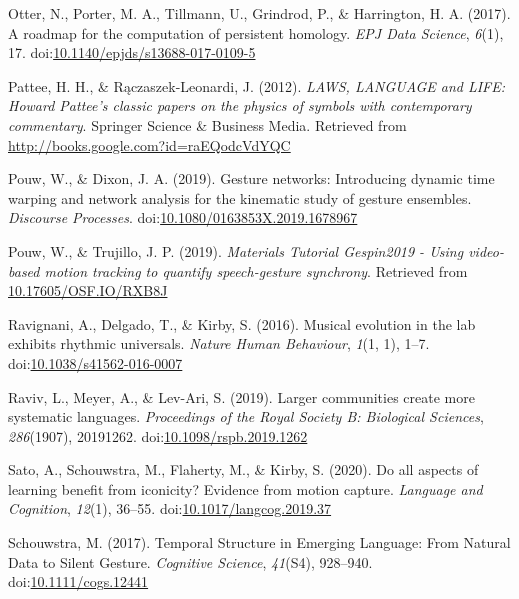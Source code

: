 \documentclass[
  man, noextraspace,floatsintext]{apa6}
\newlength{\cslhangindent}
\newenvironment{cslreferences}%
  {\setlength{\parindent}{0pt}%
  \everypar{\setlength{\hangindent}{\cslhangindent}}\ignorespaces}%
  {\par}
\begin{document}
\begin{cslreferences}
\leavevmode\hypertarget{ref-otterRoadmapComputationPersistent2017}{}%
Otter, N., Porter, M. A., Tillmann, U., Grindrod, P., \& Harrington, H. A. (2017). A roadmap for the computation of persistent homology. \emph{EPJ Data Science}, \emph{6}(1), 17. doi:\href{https://doi.org/10.1140/epjds/s13688-017-0109-5}{10.1140/epjds/s13688-017-0109-5}

\leavevmode\hypertarget{ref-patteeLAWSLANGUAGELIFE2012}{}%
Pattee, H. H., \& Rączaszek-Leonardi, J. (2012). \emph{LAWS, LANGUAGE and LIFE: Howard Pattee's classic papers on the physics of symbols with contemporary commentary}. Springer Science \& Business Media. Retrieved from \url{http://books.google.com?id=raEQodcVdYQC}

\leavevmode\hypertarget{ref-pouwGestureNetworksIntroducing2019}{}%
Pouw, W., \& Dixon, J. A. (2019). Gesture networks: Introducing dynamic time warping and network analysis for the kinematic study of gesture ensembles. \emph{Discourse Processes}. doi:\href{https://doi.org/10.1080/0163853X.2019.1678967}{10.1080/0163853X.2019.1678967}

\leavevmode\hypertarget{ref-pouwMaterialsTutorialGespin20192019}{}%
Pouw, W., \& Trujillo, J. P. (2019). \emph{Materials Tutorial Gespin2019 - Using video-based motion tracking to quantify speech-gesture synchrony}. Retrieved from \url{10.17605/OSF.IO/RXB8J}

\leavevmode\hypertarget{ref-ravignaniMusicalEvolutionLab2016}{}%
Ravignani, A., Delgado, T., \& Kirby, S. (2016). Musical evolution in the lab exhibits rhythmic universals. \emph{Nature Human Behaviour}, \emph{1}(1, 1), 1--7. doi:\href{https://doi.org/10.1038/s41562-016-0007}{10.1038/s41562-016-0007}

\leavevmode\hypertarget{ref-ravivLargerCommunitiesCreate2019}{}%
Raviv, L., Meyer, A., \& Lev-Ari, S. (2019). Larger communities create more systematic languages. \emph{Proceedings of the Royal Society B: Biological Sciences}, \emph{286}(1907), 20191262. doi:\href{https://doi.org/10.1098/rspb.2019.1262}{10.1098/rspb.2019.1262}

\leavevmode\hypertarget{ref-satoAllAspectsLearning2020}{}%
Sato, A., Schouwstra, M., Flaherty, M., \& Kirby, S. (2020). Do all aspects of learning benefit from iconicity? Evidence from motion capture. \emph{Language and Cognition}, \emph{12}(1), 36--55. doi:\href{https://doi.org/10.1017/langcog.2019.37}{10.1017/langcog.2019.37}

\leavevmode\hypertarget{ref-schouwstraTemporalStructureEmerging2017}{}%
Schouwstra, M. (2017). Temporal Structure in Emerging Language: From Natural Data to Silent Gesture. \emph{Cognitive Science}, \emph{41}(S4), 928--940. doi:\href{https://doi.org/10.1111/cogs.12441}{10.1111/cogs.12441}


\end{cslreferences}
\end{document}
